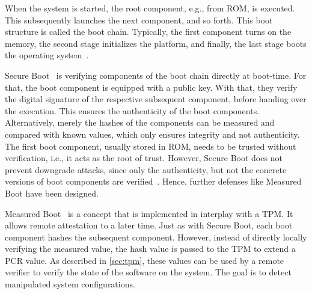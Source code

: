 When the system is started, the root component, e.g., from ROM, is executed. This subsequently launches the next component, and so forth. This boot structure is called the boot chain. Typically, the first component turns on the memory, the second stage initializes the platform, and finally, the last stage boots the operating system~\cite{Yao2020}.

Secure Boot~\cite{Hendricks2004, UEFI, Frazelle2020} is verifying components of the boot chain directly at boot-time. For that, the boot component is equipped with a public key. With that, they verify the digital signature of the respective subsequent component, before handing over the execution. This ensures the authenticity of the boot components. Alternatively, merely the hashes of the components can be measured and compared with known values, which only ensures integrity and not authenticity. The first boot component, usually stored in ROM, needs to be trusted without verification, i.e., it acts as the root of trust. However, Secure Boot does not prevent downgrade attacks, since only the authenticity, but not the concrete versions of boot components are verified~\cite{272306}. Hence, further defenses like Measured Boot have been designed.


Measured Boot~\cite{tcgMeasuredBoot} is a concept that is implemented in interplay with a TPM\@. It allows remote attestation to a later time. Just as with Secure Boot, each boot component hashes the subsequent component. However, instead of directly locally verifying the measured value, the hash value is passed to the TPM to extend a \ac{PCR} value. As described in \autoref{sec:tpm}, these values can be used by a remote verifier to verify the state of the software on the system. The goal is to detect manipulated system configurations.

